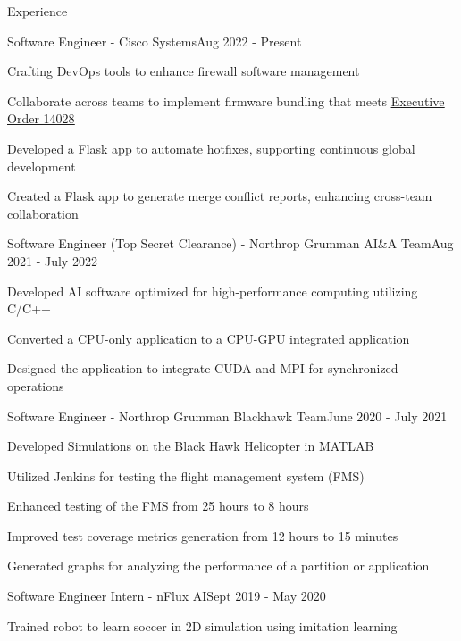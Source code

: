 \documentclass{resume}
\begin{document}
\begin{rSection}{Experience}
    \begin{rSubsection}{Software Engineer - Cisco Systems}{Aug 2022 - Present}
        \item Crafting DevOps tools to enhance firewall software management
        \item Collaborate across teams to implement firmware bundling that meets \href{https://www.whitehouse.gov/briefing-room/presidential-actions/2021/05/12/executive-order-on-improving-the-nations-cybersecurity/}{\color{blue}\underline{Executive Order 14028}}
        \item Developed a Flask app to automate hotfixes, supporting continuous global development
        \item Created a Flask app to generate merge conflict reports, enhancing cross-team collaboration
    \end{rSubsection}
    \begin{rSubsection}{Software Engineer (Top Secret Clearance) - Northrop Grumman AI\&A Team}{Aug 2021 - July 2022}
        \item Developed AI software optimized for high-performance computing utilizing C/C++
        \item Converted a CPU-only application to a CPU-GPU integrated application
        \item Designed the application to integrate CUDA and MPI for synchronized operations
    \end{rSubsection}
    \begin{rSubsection}{Software Engineer - Northrop Grumman Blackhawk Team}{June 2020 - July 2021}
        \item Developed Simulations on the Black Hawk Helicopter in MATLAB
        \item Utilized Jenkins for testing the flight management system (FMS)
        \item Enhanced testing of the FMS from 25 hours to 8 hours
        \item Improved test coverage metrics generation from 12 hours to 15 minutes
        \item Generated graphs for analyzing the performance of a partition or application
    \end{rSubsection}
    \begin{rSubsection}{Software Engineer Intern - nFlux AI}{Sept 2019 - May 2020}
        \item Trained robot to learn soccer in 2D simulation using imitation learning

\end{rSubsection}
\end{rSection}
\end{document}
